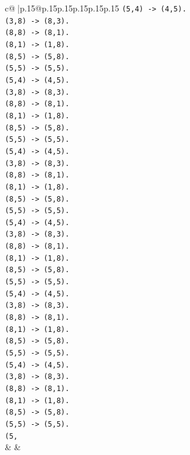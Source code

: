 \documentclass{article}
\begin{document}
{\begin{supertabular}{c@{$\;$}|p{.15\linewidth}@{}p{.15\linewidth}p{.15\linewidth}p{.15\linewidth}p{.15\linewidth}p{.15\linewidth}}
{{{\texttt{(5,4) {-}> (4,5).} \\
\texttt{(3,8) {-}> (8,3).} \\
\texttt{(8,8) {-}> (8,1).} \\
\texttt{(8,1) {-}> (1,8).} \\
\texttt{(8,5) {-}> (5,8).} \\
\texttt{(5,5) {-}> (5,5).} \\
\texttt{(5,4) {-}> (4,5).} \\
\texttt{(3,8) {-}> (8,3).} \\
\texttt{(8,8) {-}> (8,1).} \\
\texttt{(8,1) {-}> (1,8).} \\
\texttt{(8,5) {-}> (5,8).} \\
\texttt{(5,5) {-}> (5,5).} \\
\texttt{(5,4) {-}> (4,5).} \\
\texttt{(3,8) {-}> (8,3).} \\
\texttt{(8,8) {-}> (8,1).} \\
\texttt{(8,1) {-}> (1,8).} \\
\texttt{(8,5) {-}> (5,8).} \\
\texttt{(5,5) {-}> (5,5).} \\
\texttt{(5,4) {-}> (4,5).} \\
\texttt{(3,8) {-}> (8,3).} \\
\texttt{(8,8) {-}> (8,1).} \\
\texttt{(8,1) {-}> (1,8).} \\
\texttt{(8,5) {-}> (5,8).} \\
\texttt{(5,5) {-}> (5,5).} \\
\texttt{(5,4) {-}> (4,5).} \\
\texttt{(3,8) {-}> (8,3).} \\
\texttt{(8,8) {-}> (8,1).} \\
\texttt{(8,1) {-}> (1,8).} \\
\texttt{(8,5) {-}> (5,8).} \\
\texttt{(5,5) {-}> (5,5).} \\
\texttt{(5,4) {-}> (4,5).} \\
\texttt{(3,8) {-}> (8,3).} \\
\texttt{(8,8) {-}> (8,1).} \\
\texttt{(8,1) {-}> (1,8).} \\
\texttt{(8,5) {-}> (5,8).} \\
\texttt{(5,5) {-}> (5,5).} \\
\texttt{(5,} \\
            }
        }
    }
    & & \\ \\


\end{supertabular}}
\end{document}
